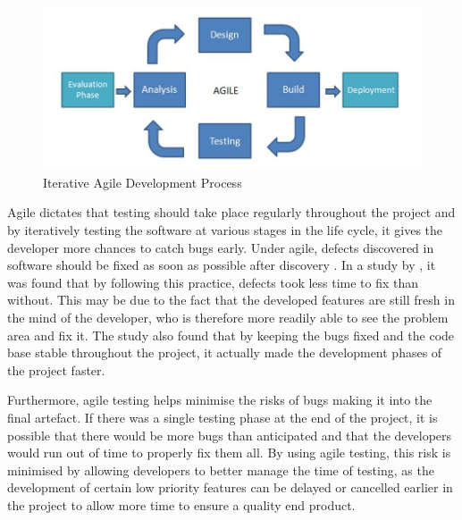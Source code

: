 \begin{figure}[ht]
	\centering
	\includegraphics[scale=0.4]{images/Agile_Image.jpg}
	\caption{Iterative Agile Development Process}
	\label{fig:agile}
\end{figure}

Agile dictates that testing should take place regularly throughout the project and by iteratively testing the software at various stages in the life cycle, it gives the developer more chances to catch bugs early.
Under agile, defects discovered in software should be fixed as soon as possible after discovery \citep{beck2001agile}.
In a study by \cite{talby2006}, it was found that by following this practice, defects took less time to fix than without.
This may be due to the fact that the developed features are still fresh in the mind of the developer, who is therefore more readily able to see the problem area and fix it.
The study also found that by keeping the bugs fixed and the code base stable throughout the project, it actually made the development phases of the project faster.

Furthermore, agile testing helps minimise the risks of bugs making it into the final artefact. 
If there was a single testing phase at the end of the project, it is possible that there would be more bugs than anticipated and that the developers would run out of time to properly fix them all. 
By using agile testing, this risk is minimised by allowing developers to better manage the time of testing, as the development of certain low priority features can be delayed or cancelled earlier in the project to allow more time to ensure a quality end product.

